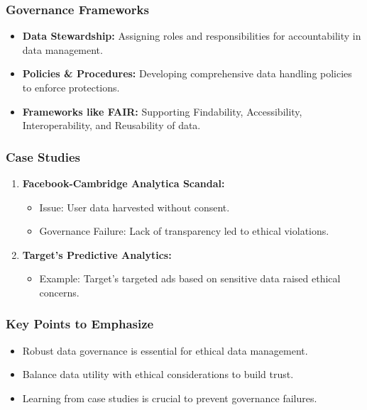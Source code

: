 \documentclass[aspectratio=169]{beamer}
\begin{document}
\begin{frame}[fragile]
    \frametitle{Governance Frameworks}
    \begin{itemize}
        \item \textbf{Data Stewardship:} Assigning roles and responsibilities for accountability in data management.
        \item \textbf{Policies \& Procedures:} Developing comprehensive data handling policies to enforce protections.
        \item \textbf{Frameworks like FAIR:} Supporting Findability, Accessibility, Interoperability, and Reusability of data.
    \end{itemize}
\end{frame}

\begin{frame}[fragile]
    \frametitle{Case Studies}
    \begin{enumerate}
        \item \textbf{Facebook-Cambridge Analytica Scandal:}
            \begin{itemize}
                \item Issue: User data harvested without consent.
                \item Governance Failure: Lack of transparency led to ethical violations.
            \end{itemize}
        \item \textbf{Target's Predictive Analytics:}
            \begin{itemize}
                \item Example: Target's targeted ads based on sensitive data raised ethical concerns.
            \end{itemize}
    \end{enumerate}
\end{frame}

\begin{frame}[fragile]
    \frametitle{Key Points to Emphasize}
    \begin{itemize}
        \item Robust data governance is essential for ethical data management.
        \item Balance data utility with ethical considerations to build trust.
        \item Learning from case studies is crucial to prevent governance failures.
    \end{itemize}
\end{frame}
\end{document}
